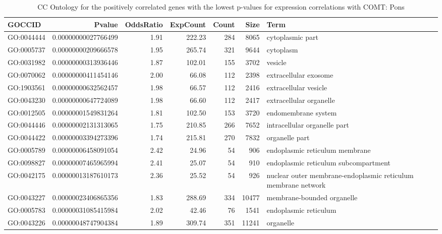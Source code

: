 \documentclass[letterpaper,12pt]{article}
\numberwithin{equation}{appendix}
\begin{document}
\noindent

\begin{landscape}

{\footnotesize {
\setlength\LTleft{-1cm}
\setlength\LTright{-1cm}
\begin{longtable}{lrrrrrl}
\caption{CC Ontology for the positively correlated genes with the lowest p-values for expression correlations with COMT: Pons} \\ 
  \toprule
GOCCID & Pvalue & OddsRatio & ExpCount & Count & Size & Term \\ 
  \midrule
GO:0044444 & 0.00000000027766499 & 1.91 & 222.23 & 284 & 8065 & cytoplasmic part \\ 
  GO:0005737 & 0.00000000209666578 & 1.95 & 265.74 & 321 & 9644 & cytoplasm \\ 
  GO:0031982 & 0.00000000313936446 & 1.87 & 102.01 & 155 & 3702 & vesicle \\ 
  GO:0070062 & 0.00000000411454146 & 2.00 & 66.08 & 112 & 2398 & extracellular exosome \\ 
  GO:1903561 & 0.00000000632562457 & 1.98 & 66.57 & 112 & 2416 & extracellular vesicle \\ 
  GO:0043230 & 0.00000000647724089 & 1.98 & 66.60 & 112 & 2417 & extracellular organelle \\ 
  GO:0012505 & 0.00000001549831264 & 1.81 & 102.50 & 153 & 3720 & endomembrane system \\ 
  GO:0044446 & 0.00000002131313065 & 1.75 & 210.85 & 266 & 7652 & intracellular organelle part \\ 
  GO:0044422 & 0.00000003394273396 & 1.74 & 215.81 & 270 & 7832 & organelle part \\ 
  GO:0005789 & 0.00000006458091054 & 2.42 & 24.96 & 54 & 906 & endoplasmic reticulum membrane \\ 
  GO:0098827 & 0.00000007465965994 & 2.41 & 25.07 & 54 & 910 & endoplasmic reticulum subcompartment \\ 
  GO:0042175 & 0.00000013187610173 & 2.36 & 25.52 & 54 & 926 & nuclear outer membrane-endoplasmic reticulum membrane network \\ 
  GO:0043227 & 0.00000023406865356 & 1.83 & 288.69 & 334 & 10477 & membrane-bounded organelle \\ 
  GO:0005783 & 0.00000031085415984 & 2.02 & 42.46 & 76 & 1541 & endoplasmic reticulum \\ 
  GO:0043226 & 0.00000048747904384 & 1.89 & 309.74 & 351 & 11241 & organelle \\ 

\end{longtable}}}
\end{landscape}
\end{document}
